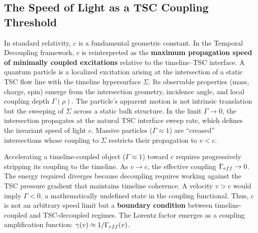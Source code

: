 \documentclass[11pt,a4paper]{article}
\let\text\relax \let\mathrm\relax \let\mathbf\relax \let\mathcal\relax
\begin{document}
\subsection{The Speed of Light as a TSC Coupling Threshold}
In standard relativity, $c$ is a fundamental geometric constant. In the Temporal Decoupling framework, $c$ is reinterpreted as the \textbf{maximum propagation speed of minimally coupled excitations} relative to the timeline--TSC interface. A quantum particle is a localized excitation arising at the intersection of a static TSC flow line with the timeline hypersurface $\Sigma$. Its observable properties (mass, charge, spin) emerge from the intersection geometry, incidence angle, and local coupling depth $\Gamma(\rho)$. The particle's apparent motion is not intrinsic translation but the sweeping of $\Sigma$ across a static bulk structure. In the limit $\Gamma \to 0$, the intersection propagates at the natural TSC interface sweep rate, which defines the invariant speed of light $c$. Massive particles ($\Gamma \approx 1$) are ``creased'' intersections whose coupling to $\Sigma$ restricts their propagation to $v < c$.

Accelerating a timeline-coupled object ($\Gamma \approx 1$) toward $c$ requires progressively stripping its coupling to the timeline. As $v \to c$, the effective coupling $\Gamma_{\text{eff}} \to 0$. The energy required diverges because decoupling requires working against the TSC pressure gradient that maintains timeline coherence. A velocity $v > c$ would imply $\Gamma < 0$, a mathematically undefined state in the coupling functional. Thus, $c$ is not an arbitrary speed limit but a \textbf{boundary condition} between timeline-coupled and TSC-decoupled regimes. The Lorentz factor emerges as a coupling amplification function: $\gamma(v) \approx 1/\Gamma_{\text{eff}}(v)$.
\end{document}
